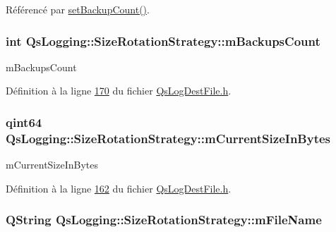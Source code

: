 Référencé par \hyperlink{classQsLogging_1_1SizeRotationStrategy_ab50da4fb0397509e5aeb826e791f09f9}{set\-Backup\-Count()}.

\hypertarget{classQsLogging_1_1SizeRotationStrategy_a8ffbf6fc9110b82a399c90ce725023e9}{
\subsubsection[{m\-Backups\-Count}]{\setlength{\rightskip}{0pt plus 5cm}int Qs\-Logging\-::\-Size\-Rotation\-Strategy\-::m\-Backups\-Count\hspace{0.3cm}{\ttfamily [private]}}}\label{classQsLogging_1_1SizeRotationStrategy_a8ffbf6fc9110b82a399c90ce725023e9}


m\-Backups\-Count 



Définition à la ligne \hyperlink{QsLogDestFile_8h_source_l00170}{170} du fichier \hyperlink{QsLogDestFile_8h_source}{Qs\-Log\-Dest\-File.\-h}.

\hypertarget{classQsLogging_1_1SizeRotationStrategy_a655f57a77d5e6384c49a2dffd899ef33}{
\subsubsection[{m\-Current\-Size\-In\-Bytes}]{\setlength{\rightskip}{0pt plus 5cm}qint64 Qs\-Logging\-::\-Size\-Rotation\-Strategy\-::m\-Current\-Size\-In\-Bytes\hspace{0.3cm}{\ttfamily [private]}}}\label{classQsLogging_1_1SizeRotationStrategy_a655f57a77d5e6384c49a2dffd899ef33}


m\-Current\-Size\-In\-Bytes 



Définition à la ligne \hyperlink{QsLogDestFile_8h_source_l00162}{162} du fichier \hyperlink{QsLogDestFile_8h_source}{Qs\-Log\-Dest\-File.\-h}.

\hypertarget{classQsLogging_1_1SizeRotationStrategy_a2a7187b9a1e4d957a9d5718c91a7f1b3}{
\subsubsection[{m\-File\-Name}]{\setlength{\rightskip}{0pt plus 5cm}Q\-String Qs\-Logging\-::\-Size\-Rotation\-Strategy\-::m\-File\-Name\hspace{0.3cm}{\ttfamily [private]}}}\label{classQsLogging_1_1SizeRotationStrategy_a2a7187b9a1e4d957a9d5718c91a7f1b3}


